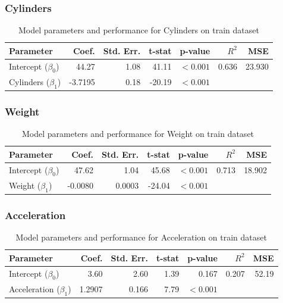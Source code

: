 \documentclass[12pt]{article}
\begin{document}
\subsubsection{Cylinders}
\begin{table}[H]
\centering
\begin{tabular}{lrrrrrr}
\toprule
\textbf{Parameter} & \textbf{Coef.} & \textbf{Std. Err.} & \textbf{t-stat} & \textbf{p-value} & $R^2$ & MSE \\
\midrule
Intercept ($\beta_0$) & 44.27 & 1.08 & 41.11 & $<0.001$ & 0.636 & 23.930 \\
Cylinders ($\beta_1$) & -3.7195 & 0.18 & -20.19 & $<0.001$ &  &  \\
\bottomrule
\end{tabular}
\caption{Model parameters and performance for Cylinders on train dataset}
\label{tab:cylinders}
\end{table}

\subsubsection{Weight}
\begin{table}[H]
\centering
\begin{tabular}{lrrrrrr}
\toprule
\textbf{Parameter} & \textbf{Coef.} & \textbf{Std. Err.} & \textbf{t-stat} & \textbf{p-value} & $R^2$ & MSE \\
\midrule
Intercept ($\beta_0$) & 47.62 & 1.04 & 45.68 & $<0.001$ & 0.713 & 18.902 \\
Weight ($\beta_1$) & -0.0080 & 0.0003 & -24.04 & $<0.001$ &  &  \\
\bottomrule
\end{tabular}
\caption{Model parameters and performance for Weight on train dataset}
\label{tab:weight}
\end{table}

\subsubsection{Acceleration}
\begin{table}[H]
\centering
\begin{tabular}{lrrrrrr}
\toprule
\textbf{Parameter} & \textbf{Coef.} & \textbf{Std. Err.} & \textbf{t-stat} & \textbf{p-value} & $R^2$ & MSE \\
\midrule
Intercept ($\beta_0$) & 3.60 & 2.60 & 1.39 & 0.167 & 0.207 & 52.19 \\
Acceleration ($\beta_1$) & 1.2907 & 0.166 & 7.79 & $<0.001$ &  &  \\
\bottomrule
\end{tabular}
\caption{Model parameters and performance for Acceleration on train dataset}
\label{tab:acceleration}
\end{table}
\end{document}
